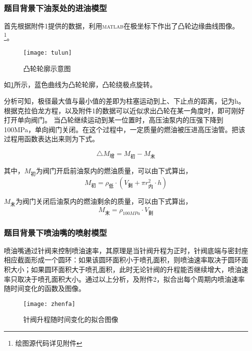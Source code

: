 \documentclass[withoutpreface,bwprint]{cumcmthesis} %
\begin{document}
\subsubsection{题目背景下油泵处的进油模型}\label{case2}
首先根据附件1提供的数据，利用\textsc{matlab}在极坐标下作出了凸轮边缘曲线图像。\footnote{绘图源代码详见附件}。

\begin{figure}[!h]
	\centering 
	\texttt{[image: tulun]}
	\caption{凸轮轮廓示意图}
	\label{fig:tulun-picture}
\end{figure}

如\cref{fig:tulun-picture}所示，蓝色曲线为凸轮轮廓，凸轮绕极点旋转。

分析可知，极径最大值与最小值的差即为柱塞运动到上、下止点的距离，记为h。根据克拉伯龙方程，以及附件1的数据可以近似求出凸轮在某一角度时，即可刚好打开单向阀门。 当凸轮继续运动到某一位置时，高压油泵内的压强下降到100MPa，单向阀门关闭。在这个过程中，一定质量的燃油被压进高压油管。把该过程用函数表达出来则为下式。

\begin{equation}
\triangle M_{\text{增}}= M_{\text{初}}-M_{\text{末}}\label{eq:ques3-5}
\end{equation}

其中，$M_{\text{初}}$为阀门开启前油泵内的燃油质量，可以由下式算出，
\begin{equation*}
M_{\text{初}} = \rho_{\text{低}}\cdot (V_{\text{剩}}+\pi r^{2}_{\text{内}}\cdot h)\label{eq:ques3-6}
\end{equation*}

$M_{\text{末}}$为阀门关闭后油泵内的燃油剩余的质量，可以由下式算出，
\begin{equation*}
M_{\text{末}} = \rho_{100MPa}\cdot V_{\text{剩}}\label{eq:ques3-7}
\end{equation*}

\subsubsection{题目背景下喷油嘴的喷射模型}\label{case3}
喷油嘴通过针阀来控制喷油速率，其原理是当针阀升程为正时，针阀底端与密封座相应截面形成一个圆环：如果该圆环面积小于喷孔面积，则喷油速率取决于圆环面积大小；如果圆环面积大于喷孔面积，此时无论针阀的升程能否继续增大，喷油速率只取决于喷孔面积大小。通过以上分析，及附件2，拟合出每个周期内喷油速率随时间变化的函数及图像。

\begin{figure}[!h]
	\centering 
	\texttt{[image: zhenfa]}
	\caption{针阀升程随时间变化的拟合图像}
	\label{fig:Q(t)-picture}
\end{figure}
\end{document}

